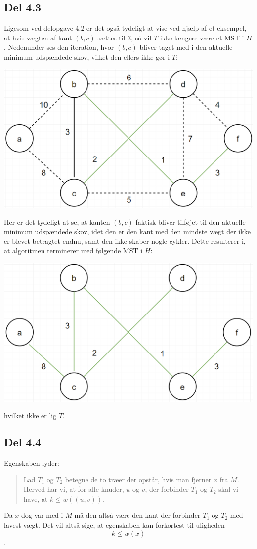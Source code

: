 \documentclass{report}
\begin{document}
\subsection*{Del 4.3}
Ligesom ved delopgave 4.2 er det også tydeligt at vise ved hjælp af et eksempel, at hvis vægten af kant $(b, c)$ sættes til 3, så vil $T$ ikke længere være et MST i $H$. Nedenunder ses den iteration, hvor  $(b, c)$ bliver taget med i den aktuelle minimum udspændede skov, vilket den ellers ikke gør i $T$:
\begin{center}
    \includegraphics[height = 5 cm]{../entities/new_new_kruskal1}
\end{center}
Her er det tydeligt at se, at kanten $(b, c)$ faktisk bliver tilføjet til den aktuelle minimum udspændede skov, idet den er den kant med den mindste vægt der ikke er blevet betragtet endnu, samt den ikke skaber nogle cykler. Dette resulterer i, at algoritmen terminerer med følgende MST i $H$:
\begin{center}
    \includegraphics[height = 5 cm]{../entities/new_new_kruskal2}
\end{center}
hvilket ikke er lig $T$.

\newpage

\subsection*{Del 4.4}
Egenskaben lyder:
\begin{quote}
    Lad $T_1$ og $T_2$ betegne de to træer der opstår, hvis man fjerner $x$ fra $M$. Herved har vi, at for alle knuder, $u$ og $v$, der forbinder $T_1$ og $T_2$ skal vi have, at $k \leq w((u, v))$. 
\end{quote}
Da $x$ dog var med i $M$ må den altså være den kant der forbinder $T_1$ og $T_2$ med lavest vægt. Det vil altså sige, at egenskaben kan forkortest til uligheden 
$$k \leq w(x)$$. \\
\end{document}
